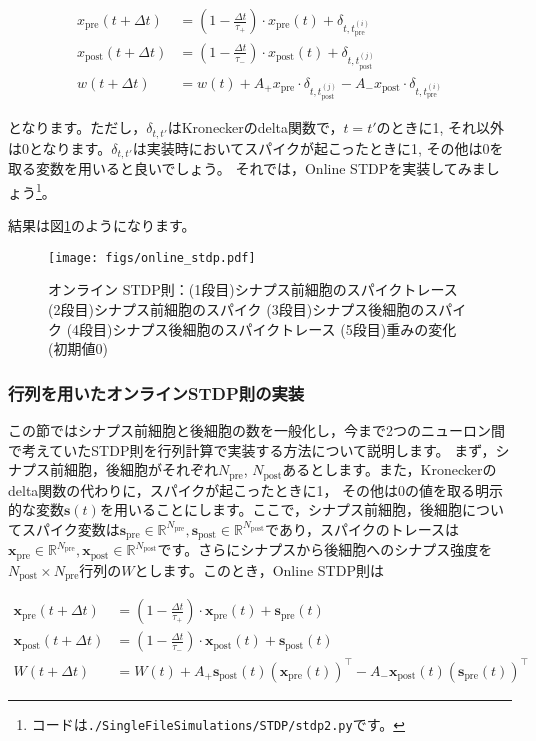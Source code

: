 \begin{align}
x_{\text{pre}}(t+\Delta t)&=\left(1-\frac{\Delta t}{\tau_{+}}\right)\cdot x_{\text{pre}}(t)+
\delta_{t,t_{\text{pre}}^{(i)}}\\
x_{\text{post}}(t+\Delta t)&=\left(1-\frac{\Delta t}{\tau_{-}}\right)\cdot x_{\text{post}}(t)+\delta_{t,t_{\text{post}}^{(j)}}\\
w(t+\Delta t)&=w(t)+A_+ x_{\text{pre}}\cdot \delta_{t,t_{\text{post}}^{(j)}} - A_-x_{\text{post}}\cdot \delta_{t,t_{\text{pre}}^{(i)}}
\end{align}


となります。ただし，$\delta_{t,t'}$はKroneckerのdelta関数で，$t=t'$のときに1, それ以外は0となります。$\delta_{t,t'}$は実装時においてスパイクが起こったときに1, その他は0を取る変数を用いると良いでしょう。
それでは，Online STDPを実装してみましょう\footnote{コードは\texttt{./SingleFileSimulations/STDP/stdp2.py}です。}。

結果は図\ref{fig:online_stdp}のようになります。
\begin{figure}[htbp]
    \centering
    \texttt{[image: figs/online\_stdp.pdf]}
    \caption{オンライン STDP則：(1段目)シナプス前細胞のスパイクトレース (2段目)シナプス前細胞のスパイク (3段目)シナプス後細胞のスパイク (4段目)シナプス後細胞のスパイクトレース (5段目)重みの変化(初期値0)}
    \label{fig:online_stdp}
\end{figure}
\subsubsection{行列を用いたオンラインSTDP則の実装}
この節ではシナプス前細胞と後細胞の数を一般化し，今まで2つのニューロン間で考えていたSTDP則を行列計算で実装する方法について説明します。
まず，シナプス前細胞，後細胞がそれぞれ$N_\text{pre}$, $N_\text{post}$あるとします。また，Kroneckerのdelta関数の代わりに，スパイクが起こったときに1， その他は0の値を取る明示的な変数$\boldsymbol{s}(t)$を用いることにします。ここで，シナプス前細胞，後細胞についてスパイク変数は$\boldsymbol{s}_{\text{pre}} \in \mathbb{R}^{N_\text{pre}}, \boldsymbol{s}_{\text{post}} \in \mathbb{R}^{N_\text{post}}$であり，スパイクのトレースは$\boldsymbol{x}_{\text{pre}} \in \mathbb{R}^{N_\text{pre}}, \boldsymbol{x}_{\text{post}} \in \mathbb{R}^{N_\text{post}}$です。さらにシナプスから後細胞へのシナプス強度を$N_\text{post} \times N_\text{pre}$行列の$W$とします。このとき，Online STDP則は


\begin{align}
\boldsymbol{x}_{\text{pre}}(t+\Delta t)&=\left(1-\frac{\Delta t}{\tau_{+}}\right)\cdot \boldsymbol{x}_{\text{pre}}(t)+
\boldsymbol{s}_{\text{pre}}(t)\\
\boldsymbol{x}_{\text{post}}(t+\Delta t)&=\left(1-\frac{\Delta t}{\tau_{-}}\right)\cdot \boldsymbol{x}_{\text{post}}(t)+\boldsymbol{s}_{\text{post}}(t)\\
W(t+\Delta t)&=W(t)+A_+ \boldsymbol{s}_{\text{post}}(t)(\boldsymbol{x}_{\text{pre}}(t))^\top - A_-\boldsymbol{x}_{\text{post}}(t)(\boldsymbol{s}_{\text{pre}}(t))^\top
\end{align}


